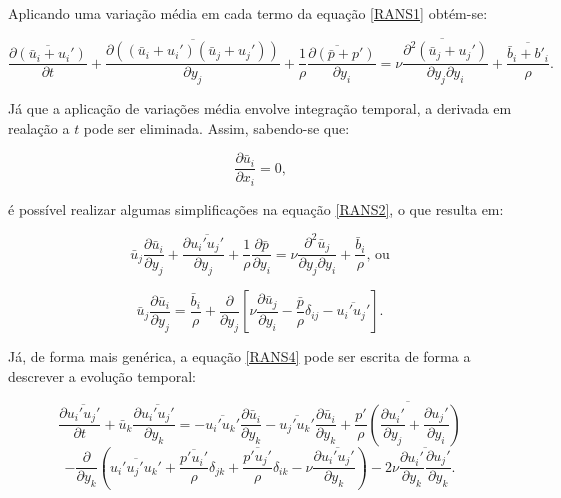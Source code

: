 \documentclass[_ArquivoPrincipal.tex]{subfiles}
\begin{document}
Aplicando uma variação média em cada termo da equação \ref{RANS1} obtém-se:

\begin{equation}
    \overline{\frac{\partial(\bar{u}_i+u_i')}{\partial t}}+\overline{\frac{\partial((\bar{u}_i+u_i')(\bar{u}_j+u_j'))}{\partial y_j}}+\overline{\frac{1}{\rho}\frac{\partial(\bar{p}+p')}{\partial y_i}}=\overline{\nu\frac{\partial^2(\bar{u}_j+u_j')}{\partial y_j\partial y_i}}+\overline{\frac{\bar{b}_i+b'_i}{\rho}}\text{.}
    \label{RANS2}
\end{equation}

Já que a aplicação de variações média envolve integração temporal, a derivada em realação a $t$ pode ser eliminada. Assim, sabendo-se que:

\begin{equation}
    \frac{\partial\bar{u}_i}{\partial x_i}=0\text{,}
    \label{dudxi}
\end{equation}

\noindent é possível realizar algumas simplificações na equação \ref{RANS2}, o que resulta em:

\begin{equation}
    \bar{u}_j\frac{\partial\bar{u}_i}{\partial y_j}+\frac{\partial\overline{u_i'u_j'}}{\partial y_j}+\frac{1}{\rho}\frac{\partial\bar{p}}{\partial y_i}=\nu\frac{\partial^2\bar{u}_j}{\partial y_j\partial y_i}+\frac{\bar{b}_i}{\rho}\text{, ou}
    \label{RANS3}
\end{equation}

\begin{equation}
    \bar{u}_j\frac{\partial\bar{u}_i}{\partial y_j}=\frac{\bar{b}_i}{\rho}+\frac{\partial}{\partial y_j}\left[\nu\frac{\partial\bar{u}_j}{\partial y_i}-\frac{\bar{p}}{\rho}\delta_{ij}-\overline{u_i'u_j'}\right]\text{.}
    \label{RANS4}
\end{equation}

Já, de forma mais genérica, a equação \ref{RANS4} pode ser escrita de forma a descrever a evolução temporal:

\[
    \frac{\partial\overline{u_i'u_j'}}{\partial t}
    +\bar{u}_k\frac{\partial{\overline{u_i'u_j'}}}{\partial y_k}
    =-\overline{u_i'u_k'}\frac{\partial\bar{u}_i}{\partial y_k}
    -\overline{u_j'u_k'}\frac{\partial\bar{u}_i}{\partial y_k}
    +\overline{\frac{p'}{\rho}\left(\frac{\partial u_i'}{\partial y_j}+\frac{\partial u_j'}{\partial y_i}\right)}
    \]
\begin{equation}
    -\frac{\partial}{\partial y_k}\left(\overline{u_i'u_j'u_k'}+\frac{\overline{p'u_i'}}{\rho}\delta_{jk}+\frac{\overline{p'u_j'}}{\rho}\delta_{ik}-\nu\frac{\partial\overline{u_i'u_j'}}{\partial y_k}\right)
    -2\nu\overline{\frac{\partial u_i'}{\partial y_k}\frac{\partial u_j'}{\partial y_k}}
    \text{.}
    \label{RANS5}
\end{equation}
\end{document}
